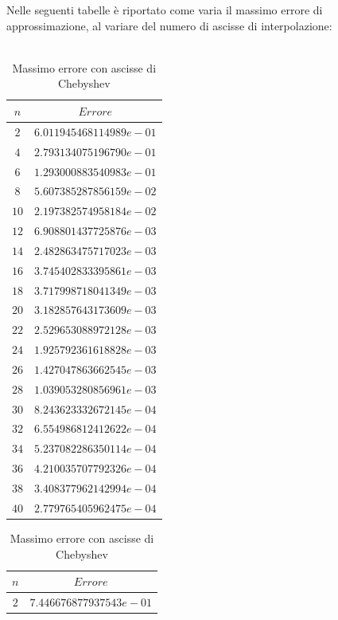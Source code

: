 Nelle seguenti tabelle è riportato come varia il massimo errore di approssimazione, al variare del numero di ascisse di interpolazione:\\\
\begin{table}[H]
	\begin{minipage}{0.5\textwidth}
		\centering
		\caption{Massimo errore con ascisse equispaziate}
		\begin{tabular}{|c|c|}
			\hline
			$n$ & $Errore$ \\
			\hline
			$2$  & $6.011945468114989e-01$ \\
			$4$  & $2.793134075196790e-01$ \\
			$6$  & $1.293000883540983e-01$ \\
			$8$  & $5.607385287856159e-02$ \\
			$10$ & $2.197382574958184e-02$ \\
			$12$ & $6.908801437725876e-03$ \\
			$14$ & $2.482863475717023e-03$ \\
			$16$ & $3.745402833395861e-03$ \\
			$18$ & $3.717998718041349e-03$ \\
			$20$ & $3.182857643173609e-03$ \\
			$22$ & $2.529653088972128e-03$ \\
			$24$ & $1.925792361618828e-03$ \\
			$26$ & $1.427047863662545e-03$ \\
			$28$ & $1.039053280856961e-03$ \\
			$30$ & $8.243623332672145e-04$ \\
			$32$ & $6.554986812412622e-04$ \\
			$34$ & $5.237082286350114e-04$ \\
			$36$ & $4.210035707792326e-04$ \\
			$38$ & $3.408377962142994e-04$ \\
			$40$ & $2.779765405962475e-04$ \\
			\hline
		\end{tabular}
	\end{minipage}
	\hspace*{\fill}
	\begin{minipage}{0.5\textwidth}
		\centering
		\caption{Massimo errore con ascisse di Chebyshev}
		\begin{tabular}{|c|c|}
			\hline
			$n$ & $Errore$ \\
			\hline
			$2$  & $7.446676877937543e-01$ \\

\end{tabular}
\end{minipage}
\end{table}
